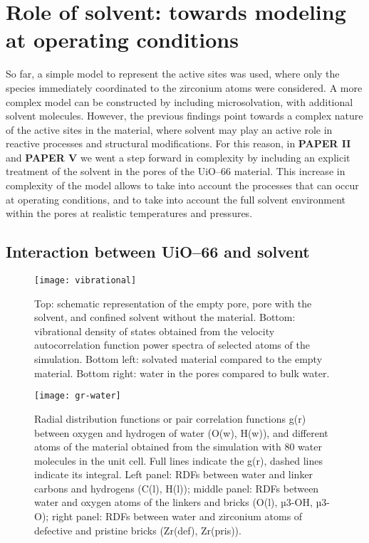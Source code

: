 \section{Role of solvent: towards modeling at operating conditions}
So far, a simple model to represent the active sites was used, where only the species immediately coordinated to the zirconium atoms were considered. A more complex model can be constructed by including microsolvation, with additional solvent molecules. However, the previous findings point towards a complex nature of the active sites in the material, where solvent may play an active role in reactive processes and structural modifications. For this reason, in \textbf{PAPER II} and \textbf{PAPER V} we went a step forward in complexity by including an explicit treatment of the solvent in the pores of the UiO--66 material. 
This increase in complexity of the model allows to take into account the processes that can occur at operating conditions, and to take into account the full solvent environment within the pores at realistic temperatures and pressures. 

\subsection{Interaction between UiO--66 and solvent}

\begin{figure}[!htbp]
	\centering
	\texttt{[image: vibrational]}
	\caption{Top: schematic representation of the empty pore, pore with the solvent, and confined solvent without the material. Bottom: vibrational density of states obtained from the velocity autocorrelation function power spectra of selected atoms of the simulation. Bottom left: solvated material compared to the empty material. Bottom right: water in the pores compared to bulk water.}
	\label{fig:vibrational}
\end{figure}

\begin{figure}[!htbp]
	\centering
	\texttt{[image: gr-water]}
	\caption{Radial distribution functions or pair correlation functions g(r) between oxygen and hydrogen of water (O(w), H(w)), and different atoms of the material obtained from the simulation with 80 water molecules in the unit cell. Full lines indicate the g(r), dashed lines indicate its integral. Left panel: RDFs between water and linker carbons and hydrogens (C(l), H(l)); middle panel: RDFs between water and oxygen atoms of the linkers and bricks (O(l), µ3-OH, µ3-O); right panel: RDFs between water and zirconium atoms of defective and pristine bricks (Zr(def), Zr(pris)). }
	\label{fig:gr-water}
\end{figure}

